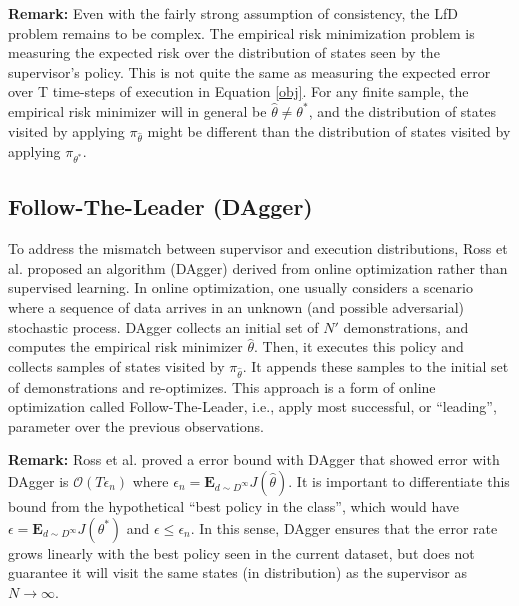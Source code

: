 \vspace{0.5em}\noindent \textbf{Remark: } Even with the fairly strong assumption of consistency, the LfD problem remains to be complex. The empirical risk minimization problem is measuring the expected risk over the distribution of states seen by the supervisor's policy. This is not quite the same as measuring the expected error over T time-steps of execution in Equation \ref{obj}. For any finite sample, the empirical risk minimizer will in general be $\hat{\theta} \ne \theta^*$, and the distribution of states visited by applying $\pi_{\hat{\theta}}$ might be different than the distribution of states visited by applying $\pi_{\theta^*}$.

\subsection{Follow-The-Leader (DAgger)}
To address the mismatch between supervisor and execution distributions, Ross et al. proposed an algorithm (DAgger) derived from online optimization rather than supervised learning. In online optimization, one usually considers a scenario where a sequence of data arrives in an unknown (and possible adversarial) stochastic process.
DAgger collects an initial set of $N'$ demonstrations, and computes the empirical risk minimizer $\hat{\theta}$.
Then, it executes this policy and collects samples of states visited by $\pi_{\hat{\theta}}$.
It appends these samples to the initial set of demonstrations and re-optimizes.
This approach is a form of online optimization called Follow-The-Leader, i.e., apply most successful, or ``leading'', parameter over the previous observations. 

\vspace{0.5em}\noindent \textbf{Remark: } Ross et al. proved a error bound with DAgger that showed error with DAgger is $\mathcal{O}(T\epsilon_n)$ where $\epsilon_n = \mathbf{E}_{d \sim D^\infty}  J(\hat{\theta})$. It is important to differentiate this bound from the hypothetical ``best policy in the class'', which would have $\epsilon = \mathbf{E}_{d \sim D^\infty}  J(\theta^*)$ and $\epsilon \le \epsilon_n$. In this sense, DAgger ensures that the error rate grows linearly with the best policy seen in the current dataset, but does not guarantee it will visit the same states (in distribution) as the supervisor as $N \rightarrow \infty$.





































